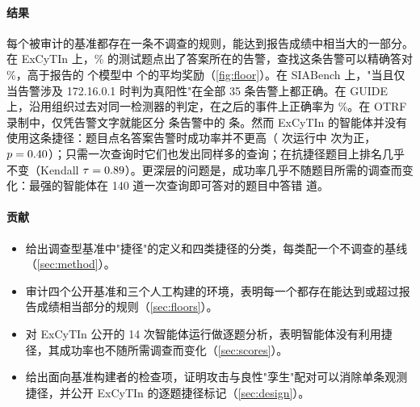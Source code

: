 \paragraph{结果} 每个被审计的基准都存在一条不调查的规则，能达到报告成绩中相当大的一部分。在 ExCyTIn 上，\oNamed\% 的测试题点出了答案所在的告警，查找这条告警可以精确答对 \oGraph\%，高于报告的 \oModels{} 个模型中 \oBelowGraph{} 个的平均奖励（\cref{fig:floor}）。在 SIABench 上，"当且仅当告警涉及 172.16.0.1 时判为真阳性"在全部 35 条告警上都正确。在 GUIDE 上，沿用组织过去对同一检测器的判定，在之后的事件上正确率为 \gHistPct\%。在 OTRF 录制中，仅凭告警文字就能区分 \otN{} 条告警中的 \otRuleCorrect{} 条。然而 ExCyTIn 的智能体并没有使用这条捷径：题目点名答案告警时成功率并不更高（\lgModels{} 次运行中 \lgPos{} 次为正，$p=0.40$）；只需一次查询时它们也发出同样多的查询；在抗捷径题目上排名几乎不变（Kendall $\tau=0.89$）。更深层的问题是，成功率几乎不随题目所需的调查而变化：最强的智能体在 140 道一次查询即可答对的题目中答错 \tcOpusFail{} 道。

\paragraph{贡献}
\begin{itemize}\setlength\itemsep{1pt}
\item 给出调查型基准中"捷径"的定义和四类捷径的分类，每类配一个不调查的基线（\cref{sec:method}）。
\item 审计四个公开基准和三个人工构建的环境，表明每一个都存在能达到或超过报告成绩相当部分的规则（\cref{sec:floors}）。
\item 对 ExCyTIn 公开的 14 次智能体运行做逐题分析，表明智能体没有利用捷径，其成功率也不随所需调查而变化（\cref{sec:scores}）。
\item 给出面向基准构建者的检查项，证明攻击与良性"孪生"配对可以消除单条观测捷径，并公开 ExCyTIn 的逐题捷径标记（\cref{sec:design}）。
\end{itemize}
